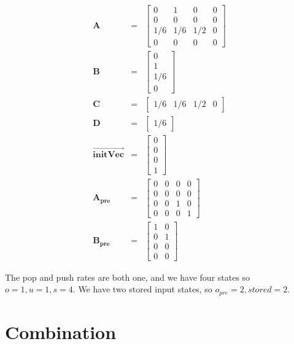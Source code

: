 \begin{eqnarray*}
\mathbf{A} & = & \left [ \begin{array} {cccc} 0 & 1 & 0 & 0 \\ 0 &
0 & 0 & 0 \\ 1/6 & 1/6 & 1/2 & 0 \\ 0 & 0 & 0 & 0 \end{array}
\right ] \\
\mathbf{B} & = & \left [ \begin{array} {c} 0 \\ 1 \\ 1/6 \\ 0
\end{array} \right ] \\
\mathbf{C} & = & \left [ \begin{array} {cccc} 1/6 & 1/6 & 1/2 & 0
\end{array} \right ] \\
\mathbf{D} & = & \left [ \begin{array} {c} 1/6 \end{array} \right
] \\
\overrightarrow{\mathbf{initVec}} & = & \left [ \begin{array} {c}
0 \\ 0 \\ 0 \\ 1 \end{array} \right ] \\
\mathbf{A_{pre}} & = & \left [ \begin{array} {cccc} 0 & 0 & 0 & 0 \\
0 & 0 & 0 & 0 \\ 0 & 0 & 1 & 0 \\ 0 & 0 & 0 & 1 \end{array}
\right ] \\
\mathbf{B_{pre}} & = & \left [ \begin{array} {cc} 1 & 0 \\ 0 & 1
\\ 0 & 0 \\ 0 & 0 \end{array} \right ]
\end{eqnarray*}

    The pop and push rates are both one, and we have four states so $o
= 1, u = 1, s = 4$. We have two stored input states, so $o_{pre} =
2, stored = 2$.

\section{Combination}

